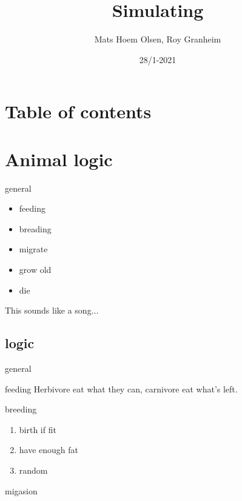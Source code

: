 \documentclass[12pt]{beamer}
\begin{document}
\author{Mats Hoem Olsen, Roy Granheim}
\title{Simulating}
\date{28/1-2021}
\subject{INF200}

\begin{frame}
\maketitle
\end{frame}

\section{Table of contents}
\begin{frame}
\tableofcontents
\end{frame}

\setcounter{section}{0}

\section{Animal logic}

\begin{frame}{general}
\begin{itemize}
\item<+-> feeding
\item<+-> breading %
\item<+-> migrate
\item<+-> grow old
\item<+-> die
\end{itemize}
\pause This sounds like a song...
\end{frame}

\subsection{logic}

\begin{frame}{general}
\begin{block}{feeding}
Herbivore eat what they can, carnivore eat what's left.
\end{block}

\begin{block}{breeding}
\begin{enumerate}[<+->]
\item birth if fit
\item have enough fat
\item random
\end{enumerate}
\end{block}

\begin{block}{migasion}
\end{block}
\end{frame}
\end{document}
